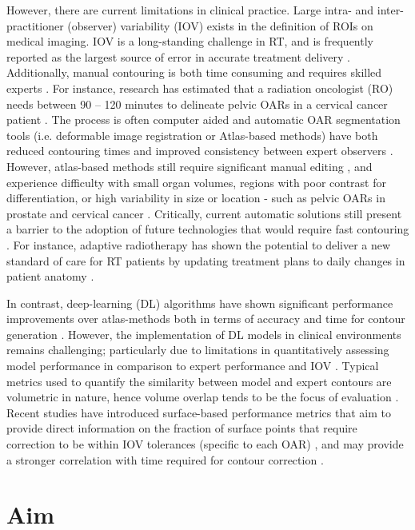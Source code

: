 However, there are current limitations in clinical practice. Large intra- and inter-practitioner (observer) variability (IOV) exists in the definition of ROIs on medical imaging. IOV is a long-standing challenge in RT, and is frequently reported as the largest source of error in accurate treatment delivery \cite{Vinod_2016, tg100}.
Additionally, manual contouring is both time consuming and requires skilled experts \cite{Nikolov_2018}. For instance, research has estimated that a radiation oncologist (RO) needs between 90 -- 120 minutes to delineate pelvic OARs in a cervical cancer patient \cite{Liu_2020}. The process is often computer aided and automatic OAR segmentation tools (i.e. deformable image registration or Atlas-based methods) have both reduced contouring times and improved consistency between expert observers \cite{Vinod_2016}. However, atlas-based methods still require significant manual editing \cite{Nikolov_2018}, and experience difficulty with small organ volumes, regions with poor contrast for differentiation, or high variability in size or location - such as pelvic OARs in prostate and cervical cancer \cite{Schreier_2020, Liu_2020}. Critically, current automatic solutions still present a barrier to the adoption of future technologies that would require fast contouring \cite{Nikolov_2018}. For instance, adaptive radiotherapy has shown the potential to deliver a new standard of care for RT patients by updating treatment plans to daily changes in patient anatomy \cite{Nikolov_2018}. 

In contrast, deep-learning (DL) algorithms have shown significant performance improvements over atlas-methods both in terms of accuracy and time for contour generation \cite{CITATION}. However, the implementation of DL models in clinical environments remains challenging; particularly due to limitations in quantitatively assessing model performance in comparison to expert performance and IOV \cite{Nikolov_2018}. Typical metrics used to quantify the similarity between model and expert contours are volumetric in nature, hence volume overlap tends to be the focus of evaluation \cite{Nikolov_2018}. Recent studies have introduced surface-based performance metrics that aim to provide direct information on the fraction of surface points that require correction to be within IOV tolerances (specific to each OAR) \cite{Nikolov_2018, Vaassen_2020}, and may provide a stronger correlation with time required for contour correction \cite{Vaassen_2020}.

\section{Aim}

